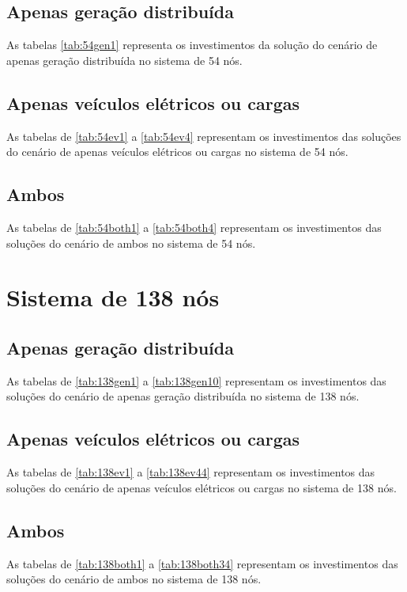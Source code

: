 \subsection{Apenas geração distribuída}
As tabelas \ref{tab:54gen1} representa os investimentos da solução do cenário de apenas geração distribuída no sistema de 54 nós.


\subsection{Apenas veículos elétricos ou cargas}
As tabelas de \ref{tab:54ev1} a \ref{tab:54ev4} representam os investimentos das soluções do cenário de apenas veículos elétricos ou cargas no sistema de 54 nós.


\subsection{Ambos}
As tabelas de \ref{tab:54both1} a \ref{tab:54both4} representam os investimentos das soluções do cenário de ambos no sistema de 54 nós.


\newpage
\section{Sistema de 138 nós}
\label{sec:tab138}

\subsection{Apenas geração distribuída}
As tabelas de \ref{tab:138gen1} a \ref{tab:138gen10} representam os investimentos das soluções do cenário de apenas geração distribuída no sistema de 138 nós.


\subsection{Apenas veículos elétricos ou cargas}
As tabelas de \ref{tab:138ev1} a \ref{tab:138ev44} representam os investimentos das soluções do cenário de apenas veículos elétricos ou cargas no sistema de 138 nós.


\subsection{Ambos}
As tabelas de \ref{tab:138both1} a \ref{tab:138both34} representam os investimentos das soluções do cenário de ambos no sistema de 138 nós.


